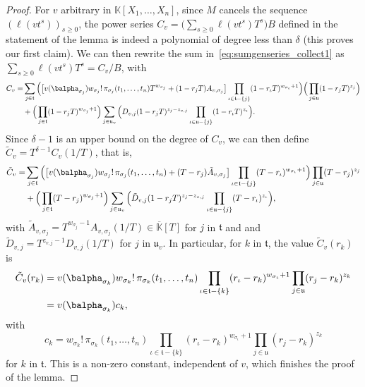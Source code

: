 \documentclass[12pt]{article}
\def\K {\ensuremath{\mathbb{K}}}
\def\Kbar {{\ensuremath{\overline{\mathbb{K}}}}}
\def\K{\mathbb{K}}
\begin{document}
\begin{proof}
	For $v$ arbitrary in $\K[X_1,\dots,X_n]$, since  $M$ cancels the sequence
	$(\ell(v t^s))_{s \ge 0}$, the power series $C_v =
	\big(\sum_{s \ge 0} \ell(vt^s)T^s\big)B$ defined in the statement of
	the lemma is indeed a polynomial of degree less than $\delta$ (this
	proves our first claim). We can then rewrite the
	sum in~\eqref{eq:sumgenseries_collect1} as $ \sum_{s \ge 0} \ell(v
	t^s)T^s =C_v/B$, with
	\begin{align*}
	C_v=&\sum_{j \in \mathfrak{t}} \Big(\big[
	v(\balpha_{\sigma_{j}}) w_{\sigma_{j}}!\, \pi_{\sigma_{j}}(t_1,\dots,t_n)
	T^{w_{\sigma_{j}}} + (1-r_{j} T)A_{v,\sigma_{j}}\big]
	\prod_{\iota \in \mathfrak{t}-\{j\}}(1-r_{\iota} T)^{w_{\sigma_{\iota}}+1}
	\Big)\Big (\prod_{j \in \mathfrak{u}}(1-r_{j} T)^{z_{j}}\Big)\\
	&+
	\Big (\prod_{j \in \mathfrak{t}}(1-r_{j} T)^{w_{\sigma_{j}}+1} \Big)
	\sum_{j \in \mathfrak{u}_v} \Big (D_{v,j} 
	(1-r_j T)^{z_{j}-z_{v,j}}
	\prod_{\iota \in \mathfrak{u}-\{j\}}(1-r_{\iota} T)^{z_{\iota}}\Big).
	\end{align*}
	Since $\delta-1$ is an upper bound on the degree of $C_v$,
	we can then define $\tilde C_v = T^{\delta-1}C_v(1/T)$, that is,
	\begin{align*}
	\tilde  C_v=&\sum_{j \in \mathfrak{t}} \Big(\big[
	v(\balpha_{\sigma_{j}})  w_{\sigma_j}!\, \pi_{\sigma_j}(t_1,\dots,t_n)
	+ (T-r_j)\tilde A_{v,\sigma_j}\big]
	\prod_{\iota \in \mathfrak{t}-\{j\}}(T-r_{\iota} )^{w_{\sigma_{\iota}}+1}
	\Big)\prod_{j \in \mathfrak{u}}(T-r_j )^{z_j}
	\\
	&+
	\Big(\prod_{j \in \mathfrak{t}}(T-r_{j} )^{w_{\sigma_j}+1}\Big)
	\sum_{j \in \mathfrak{u}_v} \Big (\tilde D_{v,j}
	(1-r_j T)^{z_{j}-z_{v,j}}
	\prod_{\iota \in \mathfrak{u}-\{j\}}(T-r_{\iota} )^{z_{\iota}}\Big),
	\end{align*}
	with $\tilde A_{v,\sigma_j} = T^{w_{\sigma_j}-1} A_{v,\sigma_j}(1/T) \in \Kbar[T]$
	for $j$ in $\mathfrak{t}$ and
	and $\tilde D_{v,j}=T^{z_{v,j}-1} D_{v,j}(1/T)$ for $j$ in $\mathfrak{u}_v$. In particular, 
	for $k$ in $\mathfrak{t}$,
	the value $\tilde C_v(r_k)$ is 
	\begin{align*}
	\tilde C_v(r_k)&= v(\balpha_{\sigma_{k}}) w_{\sigma_k}!\, \pi_{\sigma_k}(t_1,\dots,t_n)
	\prod_{\iota \in \mathfrak{t}-\{k\}}(r_\iota-r_{k} )^{w_{\sigma_{\iota}}+1}
	\prod_{j \in \mathfrak{u}}(r_j-r_{k} )^{z_{k}}\\
	&= v(\balpha_{\sigma_{k}}) c_{k},
	\end{align*}
	with 
	$$c_{k}=
	w_{\sigma_k}!\, \pi_{\sigma_k}(t_1,\dots,t_n)
	\prod_{\iota \in \mathfrak{t}-\{k\}}(r_\iota-r_{k} )^{w_{\sigma_{\iota}}+1}
	\prod_{j \in \mathfrak{u}}(r_j-r_{k} )^{z_{k}}$$
	for $k$ in $\mathfrak{t}$. This is a non-zero constant, independent 
	of $v$, which finishes the proof of the lemma.
\end{proof}
\end{document}
